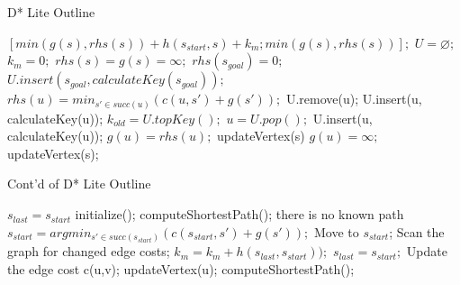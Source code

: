 \begin{algorithm}
	\caption{D* Lite Outline}
	\label{algDLite-1}
	{\fontsize{9}{9}\selectfont
    \begin{algorithmic}[1] %
      	\State \Return $[min(g(s), rhs(s)) + h(s_{start},s) + k_{m} ; min(g(s), rhs(s))];$
      \EndFunction
   	  \Statex
      	\State $U = \varnothing;$
      	\State $k_{m} = 0;$
     		\State $rhs(s) = g(s) = \infty;$
     	\EndFor
      	\State $rhs(s_{goal}) = 0;$
      	\State $U.insert(s_{goal}, calculateKey(s_{goal}));$
	  \EndFunction
	  \Statex
   	  		\State $rhs(u) = min_{s' \in succ(u)}(c(u,s') + g(s'));$
   	  	\EndIf
   	  	 U.remove(u); \EndIf
   	  		\State U.insert(u, calculateKey(u));
   	  	\EndIf
   	  \EndFunction
	  \Statex	  
      		\State $k_{old} = U.topKey();$
      		\State $u = U.pop();$
   		  		\State U.insert(u, calculateKey(u));
    	      	\State $g(u) = rhs(u);$
				 updateVertex(s) \EndFor
			\Else
				\State $g(u) = \infty;$
				 updateVertex(s); \EndFor
	   	  	\EndIf
      	\EndWhile  	  
  	  \EndFunction
    \end{algorithmic}}
\end{algorithm}

\begin{algorithm}
	\caption{Cont'd of D* Lite Outline}
	\label{algDLite-2}
	{\fontsize{9}{9}\selectfont
    \begin{algorithmic}[1] %
	  	\State $s_{last} = s_{start}$
      	\State initialize();
      	\State computeShortestPath();
			 there is no known path \EndIf
			\State $s_{start} = argmin_{s' \in succ(s_{start})}(c(s_{start},s') + g(s'));$
			\State Move to $s_{start}$;
   	      	\State Scan the graph for changed edge costs;
    	      		\State $k_{m} = k_{m} + h(s_{last}, s_{start}));$
      			  	\State $s_{last} = s_{start};$
    	      			\State Update the edge cost c(u,v);
    	      			\State updateVertex(u);
    	      		\EndFor
		      		\State computeShortestPath();
    	      	\EndIf
		\EndWhile
  	  \EndFunction
    \end{algorithmic}}
\end{algorithm}

